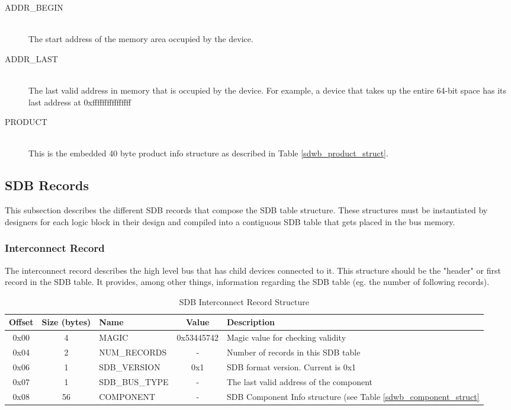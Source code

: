 \documentclass[a4paper, 12pt]{article}
\begin{document}
\begin{description}
\item[ADDR\_BEGIN] \hfill \\
The start address of the memory area occupied by the device.

\item[ADDR\_LAST] \hfill \\
The last valid address in memory that is occupied by the device. For example, a device that takes
up the entire 64-bit space has its last address at 0xffffffffffffffff

\item[PRODUCT] \hfill \\
This is the embedded 40 byte product info structure as described in Table \ref{sdwb_product_struct}.
\end{description}

\subsection{SDB Records}

This subsection describes the different SDB records that compose the SDB table structure. These
structures must be instantiated by designers for each logic block in their design and compiled into
a contiguous SDB table that gets placed in the bus memory.

\subsubsection{Interconnect Record}

The interconnect record describes the high level bus that has child devices connected to it. This
structure should be the "header" or first record in the SDB table. It provides, among other things,
information regarding the SDB table (eg. the number of following records).

\begin{center}
  \begin{savenotes}
    \begin{table}[!ht]\footnotesize
      \caption{SDB Interconnect Record Structure}\label{sdwb_interconnect_struct}\centering
        \begin{tabular}{| c | c | l | c | p{5cm} |} \hline
        Offset & Size (bytes) & Name & Value & Description \\ \hline
        0x00 & 4 & MAGIC & 0x53445742 & Magic value for checking validity \\ \hline
        0x04 & 2 & NUM\_RECORDS & - & Number of records in this SDB table \\ \hline
        0x06 & 1 & SDB\_VERSION & 0x1 & SDB format version. Current is 0x1 \\ \hline
        0x07 & 1 & SDB\_BUS\_TYPE & - & The last valid address of the component \\ \hline
        0x08 & 56 & COMPONENT & - & SDB Component Info structure (see Table \ref{sdwb_component_struct} \\ \hline
        \end{tabular}
    \end{table}
  \end{savenotes}
\end{center}
\end{document}
